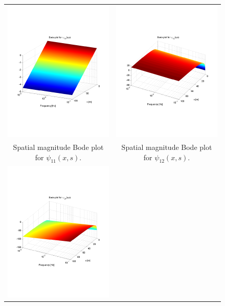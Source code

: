 \documentclass[preprint]{elsarticle}
\begin{document}
\begin{figure}
\centering
\begin{tabular}{cc}
\includegraphics[trim = 0mm 60mm 0mm 60mm, width = 8cm]{distr11_-3to-1}
&
\includegraphics[trim = 0mm 60mm 0mm 60mm, width = 8cm]{distr12_-3to-1}
\tabularnewline
Spatial magnitude Bode plot for $\psi_{11}(x,s)$.
&
Spatial magnitude Bode plot for $\psi_{12}(x,s)$.
\tabularnewline
\includegraphics[trim = 0mm 60mm 0mm 60mm, width = 8cm]{distr21_-3to-1}

\end{tabular}
\end{figure}
\end{document}

